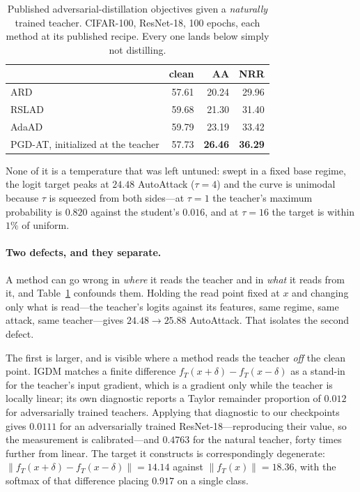 \begin{table}[t]
  \centering
  \caption{Published adversarial-distillation objectives given a \emph{naturally} trained teacher.
  CIFAR-100, ResNet-18, 100 epochs, each method at its published recipe. Every one lands below simply
  not distilling.}
  \label{tab:natteacher}
  \begin{tabular}{lrrr}
    \toprule
    & clean & AA & NRR \\
    \midrule
    ARD \citep{goldblum2020adversarially}   & 57.61 & 20.24 & 29.96 \\
    RSLAD \citep{zi2021revisiting}          & 59.68 & 21.30 & 31.40 \\
    AdaAD \citep{huang2023boosting}         & 59.79 & 23.19 & 33.42 \\
    PGD-AT, initialized at the teacher      & 57.73 & \textbf{26.46} & \textbf{36.29} \\
    \bottomrule
  \end{tabular}
\end{table}

None of it is a temperature that was left untuned: swept in a fixed base regime, the logit target
peaks at $24.48$ AutoAttack ($\tau=4$) and the curve is unimodal because $\tau$ is squeezed from both
sides---at $\tau=1$ the teacher's maximum probability is $0.820$ against the student's $0.016$, and at
$\tau=16$ the target is within $1\%$ of uniform.

\paragraph{Two defects, and they separate.} A method can go wrong in \emph{where} it reads the teacher
and in \emph{what} it reads from it, and Table~\ref{tab:natteacher} confounds them. Holding the read
point fixed at $x$ and changing only what is read---the teacher's logits against its features, same
regime, same attack, same teacher---gives $24.48\to\mathbf{25.88}$ AutoAttack. That isolates the
second defect.

The first is larger, and is visible where a method reads the teacher \emph{off} the clean point. IGDM
\citep{lee2025indirect} matches a finite difference $f_T(x+\delta)-f_T(x-\delta)$ as a stand-in for
the teacher's input gradient, which is a gradient only while the teacher is locally linear; its own
diagnostic reports a Taylor remainder proportion of $0.012$ for adversarially trained teachers.
Applying that diagnostic to our checkpoints gives $0.0111$ for an adversarially trained
ResNet-18---reproducing their value, so the measurement is calibrated---and $\mathbf{0.4763}$ for the
natural teacher, forty times further from linear. The target it constructs is correspondingly
degenerate: $\lVert f_T(x+\delta)-f_T(x-\delta)\rVert=14.14$ against $\lVert f_T(x)\rVert=18.36$, with
the softmax of that difference placing $0.917$ on a single class.

